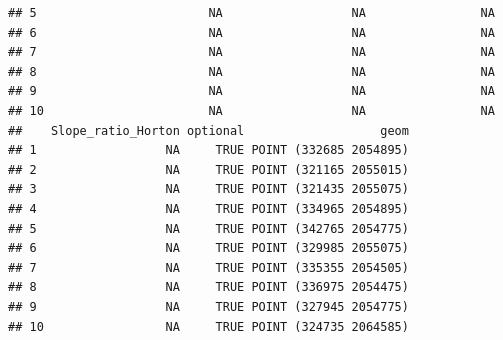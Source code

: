 \documentclass[11pt,]{article}
\newenvironment{Shaded}{\begin{snugshade}}{\end{snugshade}}
\newcommand{\KeywordTok}[1]{\textcolor[rgb]{0.13,0.29,0.53}{\textbf{#1}}}
\newcommand{\StringTok}[1]{\textcolor[rgb]{0.31,0.60,0.02}{#1}}
\newcommand{\OperatorTok}[1]{\textcolor[rgb]{0.81,0.36,0.00}{\textbf{#1}}}
\newcommand{\NormalTok}[1]{#1}
\begin{document}
\begin{verbatim}
## 5                        NA                  NA                NA
## 6                        NA                  NA                NA
## 7                        NA                  NA                NA
## 8                        NA                  NA                NA
## 9                        NA                  NA                NA
## 10                       NA                  NA                NA
##    Slope_ratio_Horton optional                   geom
## 1                  NA     TRUE POINT (332685 2054895)
## 2                  NA     TRUE POINT (321165 2055015)
## 3                  NA     TRUE POINT (321435 2055075)
## 4                  NA     TRUE POINT (334965 2054895)
## 5                  NA     TRUE POINT (342765 2054775)
## 6                  NA     TRUE POINT (329985 2055075)
## 7                  NA     TRUE POINT (335355 2054505)
## 8                  NA     TRUE POINT (336975 2054475)
## 9                  NA     TRUE POINT (327945 2054775)
## 10                 NA     TRUE POINT (324735 2064585)
\end{verbatim}

\begin{Shaded}
\end{Shaded}
\end{document}
